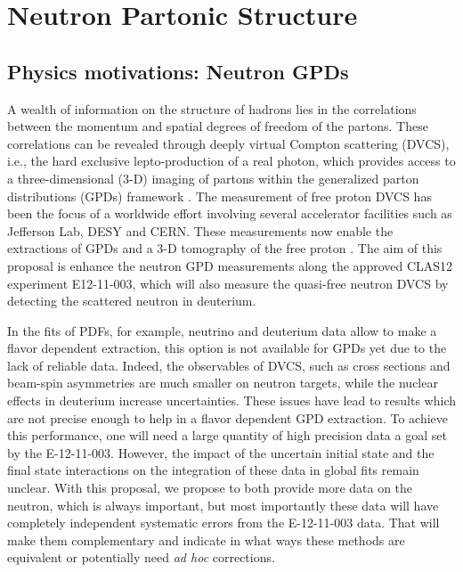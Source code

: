\chapter{Neutron Partonic Structure}
\label{chap:physics}

\section{Physics motivations: Neutron GPDs}

A wealth of information on the structure of hadrons lies in the correlations 
between the momentum and spatial degrees of freedom of the partons. These 
correlations can be revealed through deeply virtual Compton scattering (DVCS), 
i.e., the hard exclusive lepto-production of a real photon, which provides 
access to a three-dimensional (3-D) imaging of partons within the generalized 
parton distributions (GPDs) framework 
\cite{Mueller:1998fv,
Ji:1996ek,
PhysRevD.55.7114,
Radyushkin:1996nd,
PhysRevD.56.5524}. The measurement of free proton DVCS has been the focus of a 
worldwide effort \cite{PhysRevLett.87.182002,
   PhysRevLett.87.182001,
   PhysRevD.75.011103,
   Girod:2007aa,
   PhysRevC.92.055202,
   PhysRevLett.99.242501,
   PhysRevC.80.035206,
   PhysRevLett.114.032001,
   Jo:2015ema}
involving several accelerator facilities such as Jefferson Lab, DESY and  
CERN. These measurements now enable the extractions of GPDs and a 3-D 
tomography of the free proton \cite{Guidal:2013rya, PhysRevD.95.011501}. The 
aim of this proposal is enhance the neutron GPD measurements along the approved 
CLAS12 experiment E12-11-003, which will also measure the quasi-free neutron 
DVCS by detecting the scattered neutron in deuterium.  

In the fits of PDFs, \cite{Ball:2014uwa} for example, neutrino and deuterium data allow to make
a flavor dependent extraction, this option is not available for GPDs yet due to 
the lack of reliable data. Indeed, the observables of DVCS, such as cross sections
and beam-spin asymmetries are much smaller on neutron targets, while the nuclear
effects in deuterium increase uncertainties. These issues have lead to results
\cite{Mazouz:2007aa} which are not precise enough to help in a flavor dependent GPD extraction.
To achieve this performance, one will need a large quantity of high precision data
a goal set by the E-12-11-003. However, the impact of the uncertain initial state and the
final state interactions on the integration of these data in global fits remain 
unclear. With this proposal, we propose to both provide more data on the neutron,
which is always important, but most importantly these data will have completely 
independent systematic errors from the E-12-11-003 data. That will make them complementary
and indicate in what ways these methods are equivalent or potentially need {\it ad hoc}
corrections.

